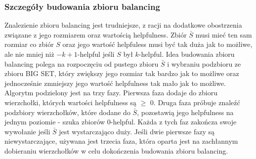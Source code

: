 \subsubsection{Szczegóły budowania zbioru balancing}

Znalezienie zbioru balancing jest trudniejsze, z racji na dodatkowe obostrzenia związane z jego rozmiarem oraz wartością
helpfulness.
Zbiór $\bar{S}$ musi mieć ten sam rozmiar co zbiór $S$ oraz jego wartość helpfuless musi być tak duża jak to możliwe,
ale nie mniej niż $-k+1$-helpful jeśli $S$ był $k$-helpful.
Idea budowania zbioru balancing polega na rozpoczęciu od pustego zbioru $\bar{S}$ i wybraniu podzbioru
ze zbioru BIG SET, który zwiększy jego rozmiar tak bardzo jak to możliwe oraz jednocześnie zmniejszy jego wartość
helpfulness tak mało jak to możliwe.
Algorytm podzielony jest na trzy fazy.
Pierwsza faza dodaje do zbioru wierzchołki, których wartości helpfulness są $\geq$ $0$.
Druga faza próbuje znaleźć podzbiory wierzchołków, które dodane do $\bar{S}$, pozostawią jego helpfulness na jednym
poziomie - szuka zbiorów $0$-helpful.
Każda z tych faz zakończa swoje wywołanie jeśli $\bar{S}$ jest wystarczająco duży.
Jeśli dwie pierwsze fazy są niewystarczające, używana jest trzecia faza, która oparta jest na zachłannym dobieraniu
wierzchołków w celu dokończenia budowania zbioru balancing.

